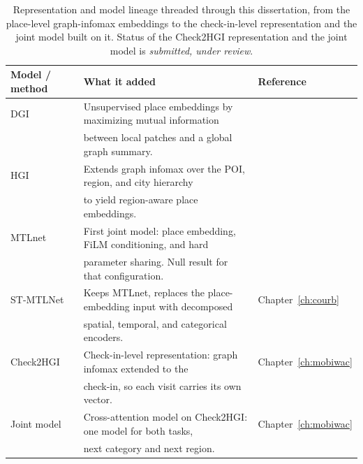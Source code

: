 \begin{table}[htbp]
  \centering
  \caption{Representation and model lineage threaded through this dissertation, from the
  place-level graph-infomax embeddings to the check-in-level representation and the joint
  model built on it. Status of the Check2HGI representation and the joint model is
  \emph{submitted, under review}.}
  \label{tab:fund:lineage}
  \begin{tabular}{@{}lll@{}}
    \toprule
    Model / method & What it added & Reference \\
    \midrule
    DGI        & Unsupervised place embeddings by maximizing mutual information       & \cite{velickovic2019deep} \\
               & between local patches and a global graph summary.                    &                           \\
    HGI        & Extends graph infomax over the POI, region, and city hierarchy       & \cite{huang2023hgi} \\
               & to yield region-aware place embeddings.                              &                     \\
    MTLnet     & First joint model: place embedding, FiLM conditioning, and hard      & \cite{silva2025mtlnet} \\
               & parameter sharing. Null result for that configuration.              &                        \\
    ST-MTLNet  & Keeps MTLnet, replaces the place-embedding input with decomposed      & Chapter~\ref{ch:courb} \\
               & spatial, temporal, and categorical encoders.                        &                        \\
    Check2HGI  & Check-in-level representation: graph infomax extended to the          & Chapter~\ref{ch:mobiwac} \\
               & check-in, so each visit carries its own vector.                     &                          \\
    Joint model & Cross-attention model on Check2HGI: one model for both tasks,        & Chapter~\ref{ch:mobiwac} \\
               & next category and next region.                                       &                          \\
    \bottomrule
  \end{tabular}
\end{table}
